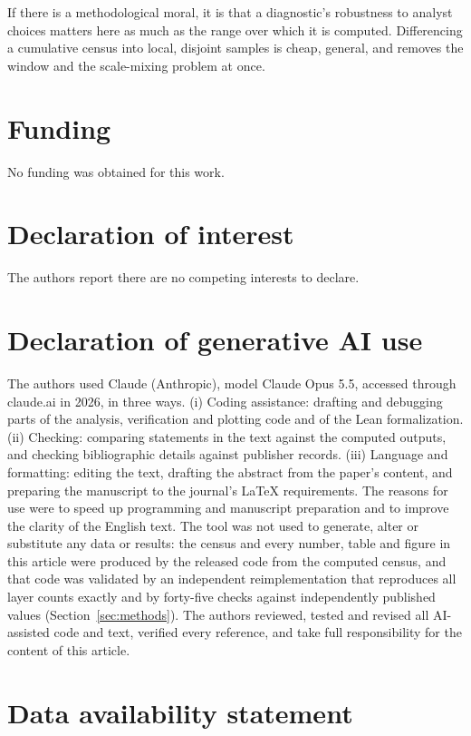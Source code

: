 \documentclass[11pt,a4paper]{article}
\begin{document}
If there is a methodological moral, it is that a diagnostic's robustness to analyst choices matters here as much as the range over which it is computed. Differencing a cumulative census into local, disjoint samples is cheap, general, and removes the window and the scale-mixing problem at once.

\section*{Funding}

No funding was obtained for this work.

\section*{Declaration of interest}

The authors report there are no competing interests to declare.

\section*{Declaration of generative AI use}

The authors used Claude (Anthropic), model Claude Opus 5.5, accessed through claude.ai in 2026, in three ways. (i) Coding assistance: drafting and debugging parts of the analysis, verification and plotting code and of the Lean formalization. (ii) Checking: comparing statements in the text against the computed outputs, and checking bibliographic details against publisher records. (iii) Language and formatting: editing the text, drafting the abstract from the paper's content, and preparing the manuscript to the journal's LaTeX requirements. The reasons for use were to speed up programming and manuscript preparation and to improve the clarity of the English text. The tool was not used to generate, alter or substitute any data or results: the census and every number, table and figure in this article were produced by the released code from the computed census, and that code was validated by an independent reimplementation that reproduces all \verifyLayers{} layer counts exactly and by forty-five checks against independently published values (Section~\ref{sec:methods}). The authors reviewed, tested and revised all AI-assisted code and text, verified every reference, and take full responsibility for the content of this article.

\section*{Data availability statement}
\end{document}
